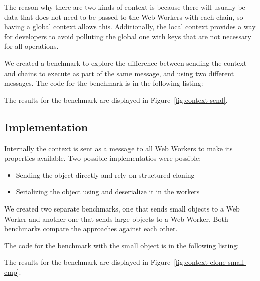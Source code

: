
The reason why there are two kinds of context is because there will usually be data that does not need to be passed to the Web Workers with each chain, so having a global context allows this. Additionally, the local context provides a way for developers to avoid polluting the global one with keys that are not necessary for all operations.

We created a benchmark to explore the difference between sending the context and chains to execute as part of the same message, and using two different messages. The code for the benchmark is in the following listing:

The results for the benchmark are displayed in Figure~\ref{fig:context-send}.

\subsection{Implementation}
Internally the context is sent as a message to all Web Workers to make its properties available. Two possible implementatios were possible:
\begin{itemize}
  \item Sending the object directly and rely on structured cloning
  \item Serializing the object using  and deserialize it in the workers
\end{itemize}


We created two separate benchmarks, one that sends small objects to a Web Worker and another one that sends large objects to a Web Worker. Both benchmarks compare the approaches against each other.

The code for the benchmark with the small object is in the following listing:

The results for the benchmark are displayed in Figure~\ref{fig:context-clone-small-cmp}.

